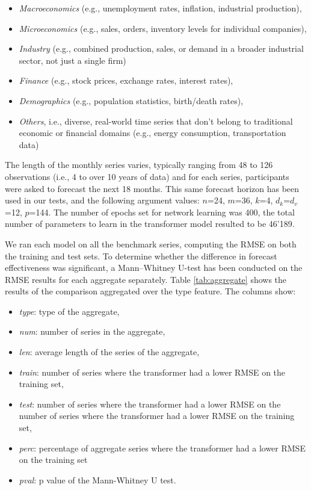 \documentclass[algorithms,article,submit,pdftex,moreauthors]{Definitions/mdpi}
\begin{document}
\begin{itemize}
	\item {\it Macroeconomics} (e.g., unemployment rates, inflation, industrial production),
	\item {\it Microeconomics} (e.g., sales, orders, inventory levels for individual companies),
	\item {\it Industry} (e.g., combined production, sales, or demand in a broader industrial sector, not just a single firm)
	\item {\it Finance} (e.g., stock prices, exchange rates, interest rates),
	\item {\it Demographics} (e.g., population statistics, birth/death rates),
	\item {\it Others}, i.e., diverse, real-world time series that don’t belong to traditional economic or financial domains (e.g., energy consumption, transportation data)
\end{itemize}

The length of the monthly series varies, typically ranging from 48 to 126 observations (i.e., 4 to over 10 years of data) and for each series, participants were asked to forecast the next 18 months. This same forecast horizon has been used in our tests, and the following argument values: $n$=24, $m$=36, $k$=4, $d_k$=$d_v$=12, $p$=144. The number of epochs set for network learning was 400, the total number of parameters to learn in the transformer model resulted to be 46'189.

We ran each model on all the benchmark series, computing the RMSE on both the training and test sets. To determine whether the difference in forecast effectiveness was significant, a Mann–Whitney U-test has been conducted on the RMSE results for each aggregate separately. Table \ref{tab:aggregate} shows the results of the comparison aggregated over the type feature. The columns show:

\begin{itemize}
	\item {\it type}: type of the aggregate,
	\item {\it num}: number of series in the aggregate,
	\item {\it len}: average length of the series of the aggregate,
	\item {\it train}: number of series where the transformer had a lower RMSE on the training set,
	\item {\it test}: number of series where the transformer had a lower RMSE on the number of series where the transformer had a lower RMSE on the training set,
	\item {\it perc}: percentage of aggregate series where the transformer had a lower RMSE on the training set
	\item {\it pval}: p value of the Mann-Whitney U test.
\end{itemize}
\end{document}
